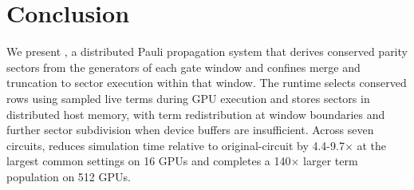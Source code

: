 \section{Conclusion}
\label{sec:conclusion}
We present \SectorQ, a distributed Pauli propagation system that derives conserved parity sectors from the generators of each gate window and confines merge and truncation to sector execution within that window.
The runtime selects conserved rows using sampled live terms during GPU execution and stores sectors in distributed host memory, with term redistribution at window boundaries and further sector subdivision when device buffers are insufficient.
Across seven circuits, \SectorQ reduces simulation time relative to original-circuit \cuPP by 4.4-9.7$\times$ at the largest common settings on 16 GPUs and completes a 140$\times$ larger term population on 512 GPUs.
